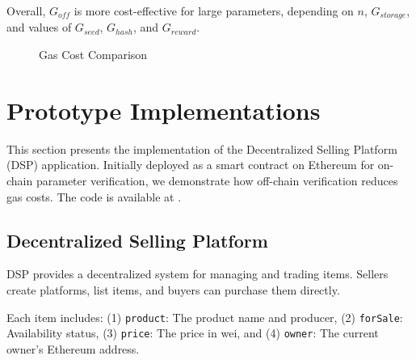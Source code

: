 \documentclass[runningheads]{llncs}
\begin{document}
Overall, \( G_{off} \) is more cost-effective for large parameters, depending on \( n \), \( G_{storage} \), and values of \( G_{seed} \), \( G_{hash} \), and \( G_{reward} \).
\begin{figure}
  \centering
  \caption{Gas Cost Comparison}
  \label{fig:gas_compare}
\end{figure}
\section{Prototype Implementations}
\label{sec:prototype-implementation}
This section presents the implementation of the Decentralized Selling Platform (DSP) application. Initially deployed as a smart contract on Ethereum for on-chain parameter verification, we demonstrate how off-chain verification reduces gas costs. The code is available at \cite{dsp}.

\subsection{Decentralized Selling Platform}
DSP provides a decentralized system for managing and trading items. Sellers create platforms, list items, and buyers can purchase them directly.

Each item includes: (1) \texttt{product}: The product name and producer, (2) \texttt{forSale}: Availability status, (3) \texttt{price}: The price in wei, and (4) \texttt{owner}: The current owner’s Ethereum address.
\end{document}
